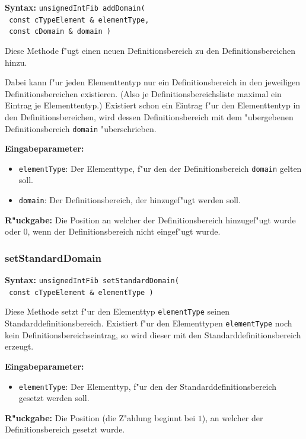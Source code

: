 \textbf{Syntax:} \verb|unsignedIntFib addDomain(| \\\verb| const cTypeElement & elementType,| \\\verb| const cDomain & domain )|

\bigskip\noindent
Diese Methode f"ugt einen neuen Definitionsbereich zu den Definitionsbereichen hinzu.

Dabei kann f"ur jeden Elementtentyp nur ein Definitionsbereich in den jeweiligen Definitionsbereichen existieren. (Also je Definitionsbereichsliste maximal ein Eintrag je Elementtentyp.) Existiert schon ein Eintrag f"ur den Elementtentyp in den Definitionsbereichen, wird dessen Definitionsbereich mit dem "ubergebenen Definitionsbereich \verb|domain| "uberschrieben.

\bigskip\noindent
\textbf{Eingabeparameter:}
\begin{itemize}
 \item \verb|elementType|: Der Elementtype, f"ur den der Definitionsbereich \verb|domain| gelten soll.
 \item \verb|domain|: Der Definitionsbereich, der hinzugef"ugt werden soll.
\end{itemize}

\bigskip\noindent
\textbf{R"uckgabe:} Die Position an welcher der Definitionsbereich hinzugef"ugt wurde oder 0, wenn der Definitionsbereich nicht eingef"ugt wurde.


\subsubsection{setStandardDomain}

\textbf{Syntax:} \verb|unsignedIntFib setStandardDomain(| \\\verb| const cTypeElement & elementType )|

\bigskip\noindent
Diese Methode setzt f"ur den Elementtyp \verb|elementType| seinen Standarddefinitionsbereich. Existiert f"ur den Elementtypen \verb|elementType| noch kein Definitionsbereichseintrag, so wird dieser mit den Standarddefinitionsbereich erzeugt.

\bigskip\noindent
\textbf{Eingabeparameter:}
\begin{itemize}
 \item \verb|elementType|: Der Elementtyp, f"ur den der Standarddefinitionsbereich gesetzt werden soll.
\end{itemize}

\bigskip\noindent
\textbf{R"uckgabe:} Die Position (die Z"ahlung beginnt bei $1$), an welcher der Definitionsbereich gesetzt wurde. 


